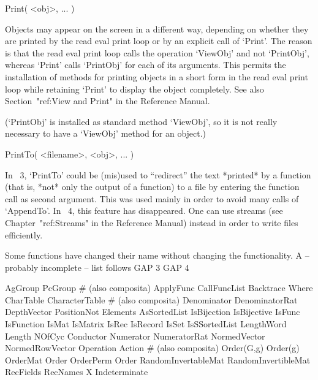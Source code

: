 \>Print( <obj>, ... )

Objects may appear on the screen in a different way,
depending on whether they are printed by the read eval print loop
or by an explicit call of `Print'.
The reason is that the read eval print loop calls the operation `ViewObj'
and not `PrintObj', whereas `Print' calls `PrintObj' for each of its
arguments.
This permits the installation of methods for printing objects in a short form
in the read eval print loop while retaining `Print' to display
the object completely.
See also Section~"ref:View and Print" in the Reference Manual.

(`PrintObj' is installed as standard method `ViewObj', so it is
not really necessary to have a `ViewObj' method for an object.)

\>PrintTo( <filename>, <obj>, ... )

In {\GAP}~3, `PrintTo' could be (mis)used to ``redirect'' the text
*printed* by a function (that is, *not* only the output of a function)
to a file by entering the function call as second argument.
This was used mainly in order to avoid many calls of `AppendTo'.
In {\GAP}~4, this feature has disappeared.
One can use streams (see Chapter~"ref:Streams" in the Reference Manual)
instead in order to write files efficiently.



Some functions have changed their name without changing the
functionality.
A -- probably incomplete -- list follows
\begintt
    GAP 3                   GAP 4

    AgGroup                 PcGroup            # (also composita)
    ApplyFunc               CallFuncList
    Backtrace               Where
    CharTable               CharacterTable     # (also composita)
    Denominator             DenominatorRat
    DepthVector             PositionNot
    Elements                AsSortedList
    IsBijection             IsBijective
    IsFunc                  IsFunction
    IsMat                   IsMatrix
    IsRec                   IsRecord
    IsSet                   IsSSortedList
    LengthWord              Length
    NOfCyc                  Conductor
    Numerator               NumeratorRat
    NormedVector            NormedRowVector
    Operation               Action            # (also composita)
    Order(G,g)              Order(g)
    OrderMat                Order
    OrderPerm               Order
    RandomInvertableMat     RandomInvertibleMat
    RecFields               RecNames
    X                       Indeterminate
\endtt

